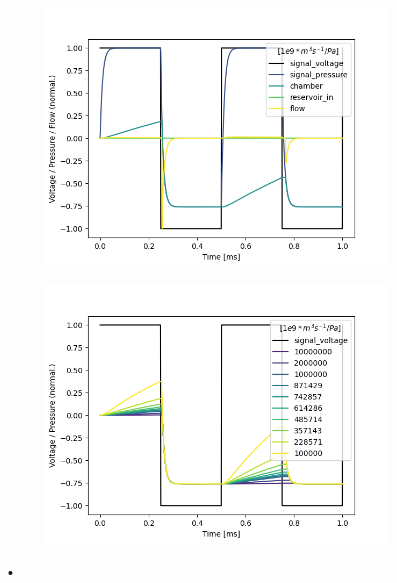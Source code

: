 \documentclass[fontsize=12pt, a4paper]{scrartcl}
\begin{document}
\begin{figure}[H]
	\centering
	\begin{subfigure}[H]{0.48\textwidth}
		\includegraphics[width=\textwidth, valign=t]{bilder/leakage/leakage_in_branch_singleweep.png}
	\end{subfigure}
	\begin{subfigure}[H]{0.48\textwidth}
		\includegraphics[width=\textwidth, valign=t]{bilder/leakage/leakage_in_branch_multiweep.png}
	\end{subfigure}
	\caption{•}
\end{figure}
\end{document}
